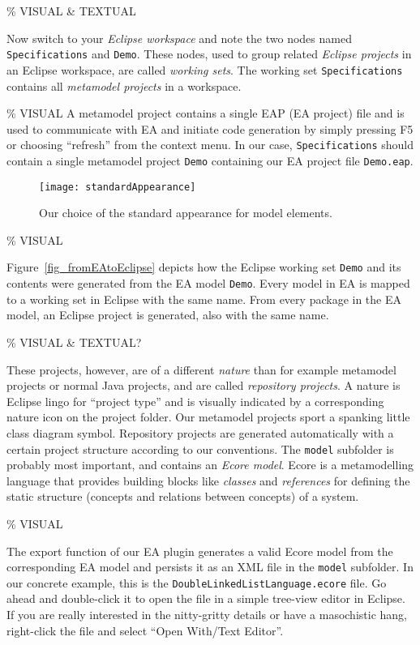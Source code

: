 \% VISUAL \& TEXTUAL

Now switch to your \emph{Eclipse workspace} and note the two nodes named \texttt{Spe\-ci\-fi\-ca\-tions} and \texttt{Demo}.  These nodes, used to group related \emph{Eclipse projects} in an Eclipse workspace, are called \emph{working sets}.
The working set \texttt{Spe\-ci\-fi\-ca\-tions} contains all \emph{metamodel projects} in a  workspace.

\% VISUAL
A metamodel project contains a single EAP (EA project) file and is used to communicate with EA and initiate code generation by simply pressing F5 or choosing ``refresh'' from the context menu.
In our case, \texttt{Specifications} should contain a single metamodel project \texttt{Demo} containing our EA project file  \texttt{Demo.eap}.

\begin{figure}[htbp]
  \centering
  \texttt{[image: standardAppearance]}
  \caption{Our choice of the standard appearance for model elements.}
  \label{fig_standardAppearanceEA}
\end{figure}

\% VISUAL

Figure~\ref{fig_fromEAtoEclipse} depicts how the Eclipse working set \texttt{Demo} and its contents were generated from the EA model \texttt{Demo}.
Every model in EA is mapped to a working set in Eclipse with the same name. 
From every package in the EA model, an Eclipse project is generated, also with the same name.

\% VISUAL \& TEXTUAL?

These projects, however, are of a different \emph{nature} than for example metamodel projects or normal Java projects, and are called \emph{repository projects}.  
A nature is Eclipse lingo for ``project type'' and is visually indicated by a corresponding nature icon on the project folder.
Our  metamodel projects sport a spanking little class diagram symbol. 
Repository projects are generated automatically  with a certain project structure according to our conventions.  
The  \texttt{model} subfolder is probably most important, and contains an  \emph{Ecore model}.  
Ecore is a metamodelling language that provides building  blocks like \emph{classes} and \emph{references} for defining the  static structure (concepts and relations between concepts) of a system.  

\% VISUAL

The  export function of our EA plugin generates a valid Ecore model from the  corresponding EA model and persists it as an XML file in the \texttt{model}  subfolder.  
In our concrete example, this is the \texttt{DoubleLinkedListLanguage.ecore} file.  
Go ahead and double-click it to open the file in a simple tree-view editor in Eclipse.  
If you are really interested in the nitty-gritty details or have a masochistic hang, right-click the file and select ``Open With/Text Editor''. 

